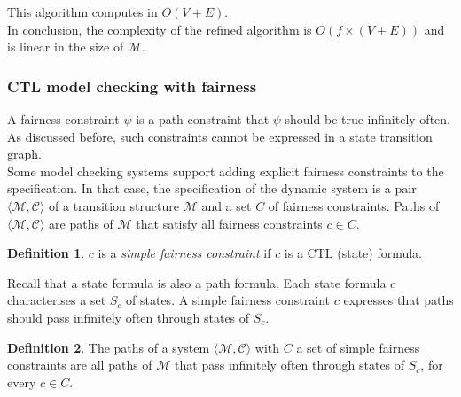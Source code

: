 \documentclass[10pt,a4paper]{article}
\theoremstyle{definition}
\newtheorem{definition}{Definition}[section]
\begin{document}
This algorithm computes in $O(V + E)$.\\

In conclusion, the complexity of the refined algorithm is $O(f \times(V +E))$ and is linear in the size of $\mathcal{M}$.

\subsubsection{CTL model checking with fairness}

A fairness constraint $\psi$ is a path constraint that $\psi$ should be true infinitely often. As discussed before, such constraints cannot be expressed in a state transition graph. \\

Some model checking systems support adding explicit fairness constraints to the specification. In that case, the specification of the dynamic system is a pair $\langle \mathcal{M}, \mathcal{C}\rangle$ of a transition structure $\mathcal{M}$ and a set $C$ of fairness constraints. Paths of $\langle \mathcal{M}, \mathcal{C}\rangle$
are paths of $\mathcal{M}$ that satisfy all fairness constraints $c\in C$.

\begin{definition}
$c$ is a \textit{simple fairness constraint} if $c$ is a CTL (state) formula.
\end{definition}

Recall that a state formula is also a path formula. Each state formula $c$ characterises a set $S_c$ of states. A simple fairness constraint $c$ expresses that paths should pass infinitely often through states of $S_c$.

\begin{definition}
The paths of a system $\langle \mathcal{M}, \mathcal{C}\rangle$ with $C$ a set of simple fairness constraints are all paths of $\mathcal{M}$ that pass infinitely often through states of $S_c$, for every $c \in C$.
\end{definition}
\end{document}
